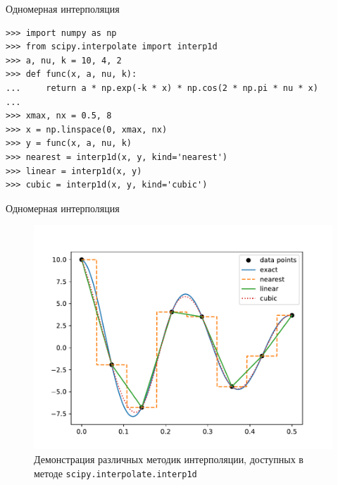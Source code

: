 \documentclass[aspectratio=169, mathserif]{beamer}	%
\begin{document}
\begin{frame}[fragile, label=c]{Одномерная интерполяция}
\scriptsize
\begin{verbatim}
>>> import numpy as np
>>> from scipy.interpolate import interp1d
>>> a, nu, k = 10, 4, 2
>>> def func(x, a, nu, k):
...     return a * np.exp(-k * x) * np.cos(2 * np.pi * nu * x)
...
>>> xmax, nx = 0.5, 8
>>> x = np.linspace(0, xmax, nx)
>>> y = func(x, a, nu, k)
>>> nearest = interp1d(x, y, kind='nearest')
>>> linear = interp1d(x, y)
>>> cubic = interp1d(x, y, kind='cubic')
\end{verbatim}
\vfill
\end{frame}

\begin{frame}[fragile, label=c]{Одномерная интерполяция}
\scriptsize
\begin{figure}[h!]
	\centering
	\includegraphics[width=.65\linewidth]{./pics/Figure_37}
	\caption{Демонстрация различных методик интерполяции, доступных в методе \texttt{scipy.interpolate.interp1d}}
\end{figure}
\vfill
\end{frame}
\end{document}
